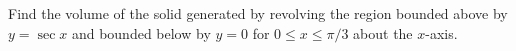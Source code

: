 \documentclass{ximera}
\begin{document}
\begin{question}%

Find the volume of the solid generated by revolving the region bounded above by \(y = \sec x\) and bounded below by \(y=0\) for \(0 \leq x \leq \pi/3\) about the \(x\)-axis.
\begin{multiplechoice}
\choice{\(\pi\)}
\choice{\(2 \pi\)}
\choice{\(3 \pi\)}
\choice{\(4 \pi\)}
\end{multiplechoice}

\end{question}
\end{document}
